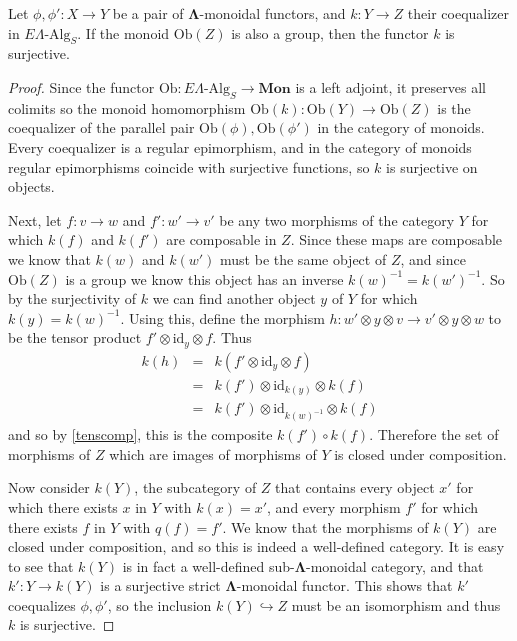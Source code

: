 \documentclass{amsbook} %
\newcommand{\mb}{\mathbf}
\newcommand{\id}{\textrm{id}}
\newcommand{\ML}{\mathbf{\Lambda}}
\newcommand{\mon}{\ensuremath{\mb{Mon}}}
\numberwithin{section}{chapter}
\begin{document}
\begin{prop}\label{coeqsurj} Let $\phi, \phi' \colon X \rightarrow Y$ be a pair of $\ML$-monoidal functors, and $k \colon  Y \rightarrow Z$ their coequalizer in $E\Lambda\mbox{-}\mathrm{Alg}_S$. If the monoid $\mathrm{Ob}(Z)$ is also a group, then the functor $k$ is surjective.
\end{prop}
\begin{proof}
Since the functor $\mathrm{Ob} \colon E\Lambda\mbox{-}\mathrm{Alg}_S \rightarrow \mon$ is a left adjoint, it preserves all colimits so the monoid homomorphism $\mathrm{Ob}(k) \colon  \mathrm{Ob}(Y) \rightarrow \mathrm{Ob}(Z)$ is the coequalizer of the parallel pair $\mathrm{Ob}(\phi), \mathrm{Ob}(\phi')$ in the category of monoids. Every coequalizer is a regular epimorphism, and in the category of monoids regular epimorphisms coincide with  surjective functions, so $k$ is surjective on objects.


Next, let $f \colon  v \rightarrow w$ and $f' \colon w' \rightarrow v'$ be any two morphisms of the category $Y$ for which $k(f)$ and $k(f')$ are composable in $Z$. Since these maps are composable we know that $k(w)$ and $k(w')$ must be the same object of $Z$, and since $\mathrm{Ob}(Z)$ is a group we know this object has an inverse $k(w)^{-1} = k(w')^{-1}$. So by the surjectivity of $k$ we can find another object $y$ of $Y$ for which $k(y) = k(w)^{-1}$. Using this, define the morphism $h \colon  w' \otimes y \otimes v \rightarrow v' \otimes y \otimes w$ to be the tensor product $f' \otimes \id_y \otimes f$. Thus
  \begin{align*}
  	k(h) & = & k(f' \otimes \id_y \otimes f) \\
  	& = & k(f') \otimes \id_{k(y)} \otimes k(f) \\
  	& = & k(f') \otimes \id_{k(w)^{-1}} \otimes k(f)
  \end{align*}
and so by \cref{tenscomp}, this is the composite $k(f') \circ k(f)$. Therefore the set of morphisms of $Z$ which are images of morphisms of $Y$ is closed under composition. 

Now consider $k(Y)$, the subcategory of $Z$ that contains every object $x'$ for which there exists $x$ in $Y$ with $k(x) = x'$, and every morphism $f'$ for which there exists $f$ in $Y$ with $q(f) = f'$. We know that the morphisms of $k(Y)$ are closed under composition, and so this is indeed a well-defined category. It is easy to see that $k(Y)$ is in fact a well-defined sub-$\ML$-monoidal category, and that $k' \colon  Y \rightarrow k(Y)$ is a surjective strict $\ML$-monoidal functor. This shows that $k'$ coequalizes $\phi, \phi'$, so the inclusion $k(Y) \hookrightarrow Z$ must be an isomorphism and thus $k$ is surjective.
\end{proof}
\end{document}
